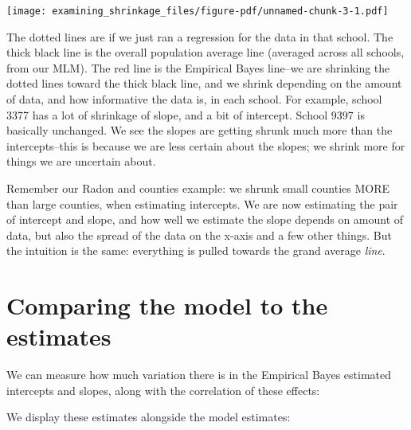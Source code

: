 \documentclass[
  letterpaper,
  DIV=11,
  numbers=noendperiod]{scrreprt}
\newenvironment{Shaded}{}{}
\newcommand{\AttributeTok}[1]{\textcolor[rgb]{0.49,0.56,0.16}{#1}}
\newcommand{\FunctionTok}[1]{\textcolor[rgb]{0.02,0.16,0.49}{#1}}
\newcommand{\NormalTok}[1]{#1}
\newcommand{\OtherTok}[1]{\textcolor[rgb]{0.00,0.44,0.13}{#1}}
\newcommand{\SpecialCharTok}[1]{\textcolor[rgb]{0.25,0.44,0.63}{#1}}
\begin{document}
\begin{center}
\texttt{[image: examining\_shrinkage\_files/figure-pdf/unnamed-chunk-3-1.pdf]}
\end{center}

The dotted lines are if we just ran a regression for the data in that
school. The thick black line is the overall population average line
(averaged across all schools, from our MLM). The red line is the
Empirical Bayes line--we are shrinking the dotted lines toward the thick
black line, and we shrink depending on the amount of data, and how
informative the data is, in each school. For example, school 3377 has a
lot of shrinkage of slope, and a bit of intercept. School 9397 is
basically unchanged. We see the slopes are getting shrunk much more than
the intercepts--this is because we are less certain about the slopes; we
shrink more for things we are uncertain about.

Remember our Radon and counties example: we shrunk small counties MORE
than large counties, when estimating intercepts. We are now estimating
the pair of intercept and slope, and how well we estimate the slope
depends on amount of data, but also the spread of the data on the x-axis
and a few other things. But the intuition is the same: everything is
pulled towards the grand average \emph{line}.

\section{Comparing the model to the
estimates}\label{comparing-the-model-to-the-estimates}

We can measure how much variation there is in the Empirical Bayes
estimated intercepts and slopes, along with the correlation of these
effects:

\begin{Shaded}
\end{Shaded}

We display these estimates alongside the model estimates:
\end{document}
